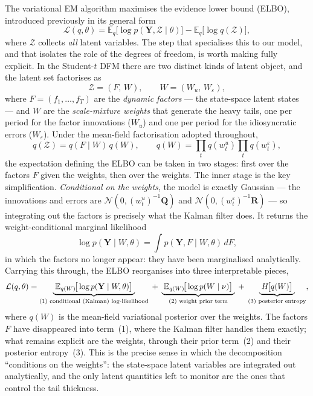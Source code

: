 \documentclass[11pt, a4paper, oneside]{article}
\begin{document}
The variational EM algorithm maximises the evidence lower bound
(ELBO), introduced previously in its general
form
\[
\mathcal{L}(q, \theta)
= \mathbb{E}_q\!\big[\log p(\mathbf{Y}, \mathcal{Z}\mid\theta)\big]
- \mathbb{E}_q\!\big[\log q(\mathcal{Z})\big],
\]
where $\mathcal{Z}$ collects \emph{all} latent variables. The step
that specialises this to our model, and that isolates the role of the
degrees of freedom, is worth making fully explicit. In the
Student-$t$ DFM there are two distinct kinds of latent object, and the
latent set factorises as
\[
\mathcal{Z} = (F,\, W), \qquad W = (W_u,\, W_\varepsilon),
\]
where $F = (f_1,\dots,f_T)$ are the \emph{dynamic factors} --- the
state-space latent states --- and $W$ are the \emph{scale-mixture
weights} that generate the heavy tails, one per period for the factor
innovations ($W_u$) and one per period for the idiosyncratic errors
($W_\varepsilon$). Under the mean-field factorisation adopted
throughout,
\[
q(\mathcal{Z}) = q(F\mid W)\,q(W),
\qquad
q(W) = \prod_t q(w^u_t)\prod_t q(w^\varepsilon_t),
\]
the expectation defining the ELBO can be taken in two stages: first
over the factors $F$ given the weights, then over the weights. The
inner stage is the key simplification. \emph{Conditional on the
weights}, the model is exactly Gaussian --- the innovations and errors
are $\mathcal{N}(0,(w^u_t)^{-1}\mathbf{Q})$ and
$\mathcal{N}(0,(w^\varepsilon_t)^{-1}\mathbf{R})$ --- so integrating
out the factors is precisely what the Kalman filter does. It returns
the weight-conditional marginal likelihood
\[
\log p(\mathbf{Y}\mid W,\theta)
= \int p(\mathbf{Y}, F\mid W,\theta)\, dF,
\]
in which the factors no longer appear: they have been marginalised
analytically. Carrying this through, the ELBO reorganises into three
interpretable pieces,
\[
\mathcal{L}(q,\theta)
=
\underbrace{\;\mathbb{E}_{q(W)}\!\big[\log p(\mathbf{Y} \mid W, \theta)\big]\;}_{\footnotesize (1)\ \text{conditional (Kalman) log-likelihood}}
\;+\;
\underbrace{\;\mathbb{E}_{q(W)}\!\big[\log p(W \mid \nu)\big]\;}_{\footnotesize (2)\ \text{weight prior term}}
\;+\;
\underbrace{\;H\!\big[q(W)\big]\;}_{\footnotesize (3)\ \text{posterior entropy}},
\]
where $q(W)$ is the mean-field variational posterior over the weights.
The factors $F$ have disappeared into term~(1), where the Kalman
filter handles them exactly; what remains explicit are the weights,
through their prior term~(2) and their posterior entropy~(3). This is
the precise sense in which the decomposition ``conditions on the
weights'': the state-space latent variables are integrated out
analytically, and the only latent quantities left to monitor are the
ones that control the tail thickness.
\end{document}
